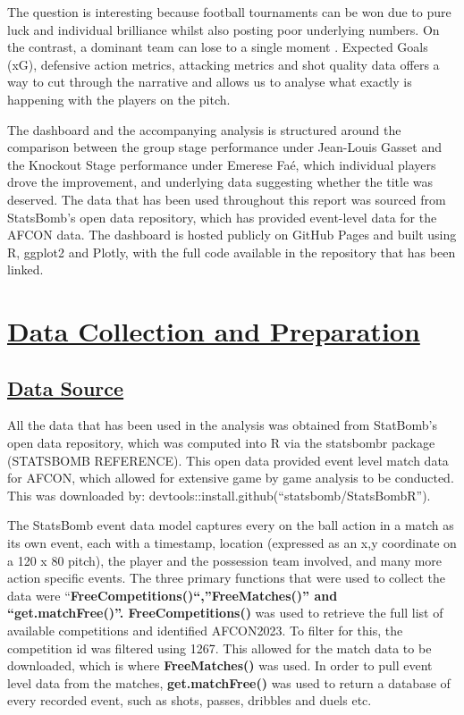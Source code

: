 \documentclass[
  11pt,
  letterpaper,
  DIV=11,
  numbers=noendperiod]{scrartcl}
\begin{document}
The question is interesting because football tournaments can be won due
to pure luck and individual brilliance whilst also posting poor
underlying numbers. On the contrast, a dominant team can lose to a
single moment . Expected Goals (xG), defensive action metrics, attacking
metrics and shot quality data offers a way to cut through the narrative
and allows us to analyse what exactly is happening with the players on
the pitch.

The dashboard and the accompanying analysis is structured around the
comparison between the group stage performance under Jean-Louis Gasset
and the Knockout Stage performance under Emerese Faé, which individual
players drove the improvement, and underlying data suggesting whether
the title was deserved. The data that has been used throughout this
report was sourced from StatsBomb's open data repository, which has
provided event-level data for the AFCON data. The dashboard is hosted
publicly on GitHub Pages and built using R, ggplot2 and Plotly, with the
full code available in the repository that has been linked.

\section{\texorpdfstring{\ul{Data Collection and
Preparation}}{Data Collection and Preparation}}\label{data-collection-and-preparation}

\subsection{\texorpdfstring{\ul{Data
Source}}{Data Source}}\label{data-source}

All the data that has been used in the analysis was obtained from
StatBomb's open data repository, which was computed into R via the
statsbombr package (STATSBOMB REFERENCE). This open data provided event
level match data for AFCON, which allowed for extensive game by game
analysis to be conducted. This was downloaded by:
devtools::install.github(``statsbomb/StatsBombR'').

The StatsBomb event data model captures every on the ball action in a
match as its own event, each with a timestamp, location (expressed as an
x,y coordinate on a 120 x 80 pitch), the player and the possession team
involved, and many more action specific events. The three primary
functions that were used to collect the data were
``\textbf{FreeCompetitions()``,''FreeMatches()'' and
``get.matchFree()''. FreeCompetitions()} was used to retrieve the full
list of available competitions and identified AFCON2023. To filter for
this, the competition id was filtered using 1267. This allowed for the
match data to be downloaded, which is where \textbf{FreeMatches()} was
used. In order to pull event level data from the matches,
\textbf{get.matchFree()} was used to return a database of every recorded
event, such as shots, passes, dribbles and duels etc.
\end{document}
